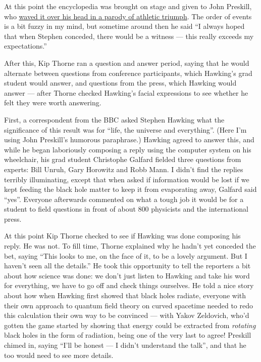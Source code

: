\documentclass{article}
\begin{document}
At this point the encyclopedia was brought on stage and given to John
Preskill, who \href{dublin/index.html\#preskill}{waved it over his head
in a parody of athletic triumph}. The order of events is a bit fuzzy in
my mind, but sometime around then he said ``I always hoped that when
Stephen conceded, there would be a witness --- this really exceeds my
expectations.''

After this, Kip Thorne ran a question and answer period, saying that he
would alternate between questions from conference participants, which
Hawking's grad student would answer, and questions from the press, which
Hawking would answer --- after Thorne checked Hawking's facial
expressions to see whether he felt they were worth answering.

First, a correspondent from the BBC asked Stephen Hawking what the
significance of this result was for ``life, the universe and
everything''. (Here I'm using John Preskill's humorous paraphrase.)
Hawking agreed to answer this, and while he began laboriously composing
a reply using the computer system on his wheelchair, his grad student
Christophe Galfard fielded three questions from experts: Bill Unruh,
Gary Horowitz and Robb Mann. I didn't find the replies terribly
illuminating, except that when asked if information would be lost if we
kept feeding the black hole matter to keep it from evaporating away,
Galfard said ``yes''. Everyone afterwards commented on what a tough job
it would be for a student to field questions in front of about 800
physicists and the international press.

At this point Kip Thorne checked to see if Hawking was done composing
his reply. He was not. To fill time, Thorne explained why he hadn't yet
conceded the bet, saying ``This looks to me, on the face of it, to be a
lovely argument. But I haven't seen all the details.'' He took this
opportunity to tell the reporters a bit about how science was done: we
don't just listen to Hawking and take his word for everything, we have
to go off and check things ourselves. He told a nice story about how
when Hawking first showed that black holes radiate, everyone with their
own approach to quantum field theory on curved spacetime needed to redo
this calculation their own way to be convinced --- with Yakov Zeldovich,
who'd gotten the game started by showing that energy could be extracted
from \emph{rotating} black holes in the form of radiation, being one of
the very last to agree! Preskill chimed in, saying ``I'll be honest ---
I didn't understand the talk'', and that he too would need to see more
details.
\end{document}

